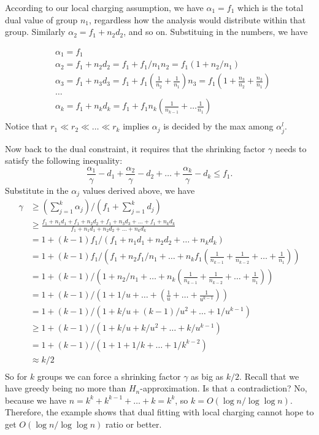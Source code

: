 \documentclass[oneside,final]{ucr}
\begin{document}
According to our local charging assumption, we have $\alpha_1 = f_1$
which is the total dual value of group $n_1$, regardless how the
analysis would distribute within that group. Similarly $\alpha_2 = f_1
+ n_2 d_2$, and so on. Substituing in the numbers, we have

\begin{align*}
  &\alpha_1 = f_1\\
  &\alpha_2 = f_1 + n_2 d_2 = f_1 + f_1/n_1 n_2 = f_1 (1 + n_2 /
  n_1)\\
  &\alpha_3 = f_1 + n_3 d_3 = f_1 + f_1 (\frac{1}{n_2} +
  \frac{1}{n_1}) n_3 = f_1 (1 + \frac{n_3}{n_2} + \frac{n_3}{n_1})\\
  &\ldots\\
  &\alpha_k = f_1 + n_k d_k = f_1 + f_1 n_k (\frac{1}{n_{k-1}} + \ldots
  \frac{1}{n_1})\\
\end{align*}
Notice that $r_1 \ll r_2 \ll \ldots \ll r_k$ implies $\alpha_j$ is
decided by the max among $\alpha_j^l$.

Now back to the dual constraint, it requires that the shrinking factor
$\gamma$ needs to satisfy the following inequality:
\begin{equation}
  \frac{\alpha_1}{\gamma} - d_1 + \frac{\alpha_2}{\gamma} - d_2 +
  \ldots + \frac{\alpha_k}{\gamma} - d_k \leq f_1.
\end{equation}
Substitute in the $\alpha_j$ values derived above, we have
\begin{align*}
  \gamma &\geq (\sum_{j=1}^k \alpha_j) / (f_1 + \sum_{j=1}^k d_j)\\
  &\geq \frac{f_1 + n_1 d_1 + f_1 + n_2 d_2 + f_1 + n_3 d_3 + \ldots +
    f_1 + n_k
    d_k}{f_1 + n_1 d_1 + n_2 d_2 + \ldots + n_k d_k}\\
  &= 1 + (k-1)f_1 / (f_1 + n_1 d_1 + n_2 d_2 + \ldots + n_k d_k)\\
  &= 1 + (k-1)f_1 / \left(f_1 + n_2 f_1 / n_1 + \ldots + n_k f_1
    (\frac{1}{n_{k-1}} + \frac{1}{n_{k-2}} + \ldots +
    \frac{1}{n_1})\right)\\
  &= 1 + (k-1) / \left(1 + n_2 / n_1 + \ldots + n_k
    (\frac{1}{n_{k-1}} + \frac{1}{n_{k-2}} + \ldots +
    \frac{1}{n_1})\right)\\
  &= 1 + (k-1) / \left(1 + 1/u + \ldots + (\frac{1}{u} + \ldots +
    \frac{1}{u^{k-1}})\right)\\
  &= 1 + (k-1) / \left(1 + k/u + (k-1)/u^2 + \ldots +
    1/u^{k-1}\right)\\
  &\geq 1 + (k-1) / \left(1 + k/u + k/u^2 + \ldots +
    k/u^{k-1}\right)\\
  &= 1 + (k-1) / \left(1 + 1 + 1/k + \ldots + 1/k^{k-2}\right)\\
  &\approx k/2\\
\end{align*}
So for $k$ groups we can force a shrinking factor $\gamma$ as big as
$k/2$. Recall that we have greedy being no more than
$H_n$-approximation. Is that a contradiction? No, because we have
$n=k^k + k^{k-1} + \ldots + k = k^k$, so $k = O(\log n / \log\log
n)$. Therefore, the example shows that dual fitting with local
charging cannot hope to get $O(\log n / \log\log n)$ ratio or better.
\end{document}
